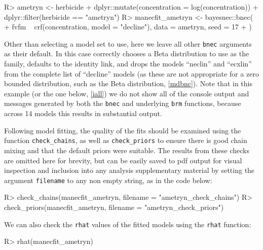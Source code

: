 \documentclass[
  shortnames]{jss}
\begin{document}
\begin{CodeChunk}
\begin{CodeInput}
R> ametryn <- herbicide %
+   dplyr::mutate(concentration = log(concentration)) %
+   dplyr::filter(herbicide == "ametryn")
R> manecfit_ametryn <- bayesnec::bnec(
+   fvfm ~ crf(concentration, model = "decline"), data = ametryn, seed = 17
+ )
\end{CodeInput}
\end{CodeChunk}

Other than selecting a model set to use, here we leave all other \texttt{bnec} arguments as their default. In this case  correctly chooses a Beta distribution to use as the family, defaults to the identity link, and drops the models ``neclin'' and ``ecxlin'' from the complete list of ``decline'' models (as these are not appropriate for a zero bounded distribution, such as the Beta distribution, \ref{mdbnc}). Note that in this example (or the one below, \ref{iall}) we do not show all of the console output and messages generated by both the \texttt{bnec} and underlying \texttt{brm} functions, because across 14 models this results in substantial output.

Following model fitting, the quality of the fits should be examined using the function \texttt{check\_chains}, as well as \texttt{check\_priors} to ensure there is good chain mixing and that the default priors were suitable. The results from these checks are omitted here for brevity, but can be easily saved to pdf output for visual inspection and inclusion into any analysis supplementary material by setting the argument \texttt{filename} to any non empty string, as in the code below:

\begin{CodeChunk}
\begin{CodeInput}
R> check_chains(manecfit_ametryn, filename = "ametryn_check_chains")
R> check_priors(manecfit_ametryn, filename = "ametryn_check_priors")
\end{CodeInput}
\end{CodeChunk}

We can also check the \texttt{rhat} values of the fitted models using the \texttt{rhat} function:

\begin{CodeChunk}
\begin{CodeInput}
R> rhat(manecfit_ametryn)
\end{CodeInput}
\end{CodeChunk}
\end{document}
